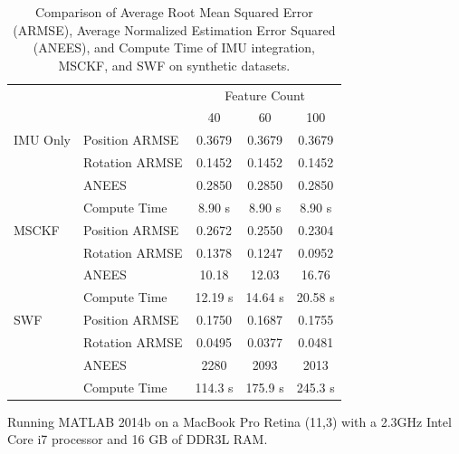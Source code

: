 \documentclass[letterpaper, 10 pt, conference]{ieeeconf}  %
\newcommand\T{\rule{0pt}{2.6ex}}        %
\newcommand\B{\rule[-1.2ex]{0pt}{0pt}} %
\begin{document}
\begin{table}
    \centering
    \caption{Comparison of Average Root Mean Squared Error (ARMSE), Average Normalized Estimation Error Squared (ANEES), and Compute Time of IMU integration, MSCKF, and SWF on synthetic datasets.}
    \begin{threeparttable}
    \begin{tabular}{llccc} 
                    &                   & \multicolumn{3}{c}{Feature Count} \B      \\ \cline{3-5}
                    &                   & 40        & 60        & 100       \T\B    \\ \hline
        IMU Only    & Position ARMSE    & 0.3679    & 0.3679    & 0.3679    \T      \\
                    & Rotation ARMSE    & 0.1452    & 0.1452    & 0.1452            \\
                    & ANEES             & 0.2850    & 0.2850    & 0.2850            \\
                    & Compute Time\tnote{\dag}      & 8.90 s    & 8.90 s    & 8.90 s    \B      \\ \hline
        MSCKF       & Position ARMSE    & 0.2672    & 0.2550    & 0.2304    \T      \\
                    & Rotation ARMSE    & 0.1378    & 0.1247    & 0.0952            \\
                    & ANEES             & 10.18     & 12.03     & 16.76             \\
                    & Compute Time\tnote{\dag}     & 12.19 s   & 14.64 s   & 20.58 s   \B      \\ \hline
        SWF         & Position ARMSE    & 0.1750    & 0.1687    & 0.1755    \T      \\
                    & Rotation ARMSE    & 0.0495    & 0.0377    & 0.0481            \\
                    & ANEES             & 2280      & 2093      & 2013              \\
                    & Compute Time\tnote{\dag}     & 114.3 s   & 175.9 s   & 245.3 s   \B      \\ \hline
    \end{tabular}
    \begin{tablenotes}
        \item [\dag] Running MATLAB 2014b on a MacBook Pro Retina (11,3) with a 2.3GHz Intel Core i7 processor and 16 GB of DDR3L RAM.
    \end{tablenotes}
    \end{threeparttable}
    \label{tab:rmse_nees}
\end{table}
\end{document}
